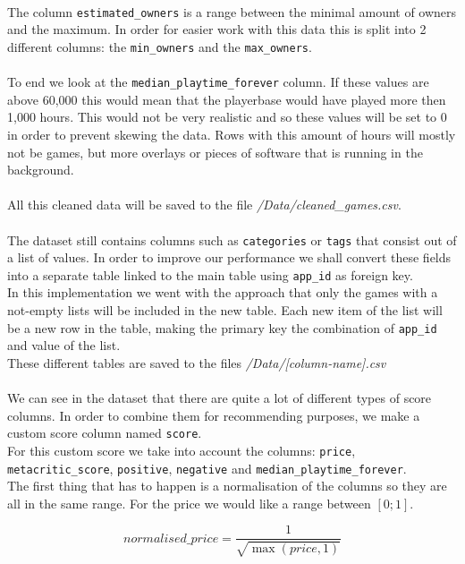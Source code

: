 \documentclass{article}
\begin{document}
	\\
	The column \texttt{estimated\_owners} is a range between the minimal amount of owners and the maximum. In order for easier work with this data this is split into 2 different columns: the \texttt{min\_owners} and the \texttt{max\_owners}.\\
	\\
	To end we look at the \texttt{median\_playtime\_forever} column. If these values are above 60,000 this would mean that the playerbase would have played more then 1,000 hours. This would not be very realistic and so these values will be set to 0 in order to prevent skewing the data. Rows with this amount of hours will mostly not be games, but more overlays or pieces of software that is running in the background.\\
	\\
	All this cleaned data will be saved to the file \textit{/Data/cleaned\_games.csv}.\\
	\\
	The dataset still contains columns such as \texttt{categories} or \texttt{tags} that consist out of a list of values. In order to improve our performance we shall convert these fields into a separate table linked to the main table using \texttt{app\_id} as foreign key.\\
	In this implementation we went with the approach that only the games with a not-empty lists will be included in the new table. Each new item of the list will be a new row in the table, making the primary key the combination of \texttt{app\_id} and value of the list.\\
	These different tables are saved to the files \textit{/Data/[column-name].csv}\\
	\\
	We can see in the dataset that there are quite a lot of different types of score columns. In order to combine them for recommending purposes, we make a custom score column named \texttt{score}.\\
	For this custom score we take into account the columns: \texttt{price}, \texttt{metacritic\_score}, \texttt{positive}, \texttt{negative} and \texttt{median\_playtime\_forever}.\\
	The first thing that has to happen is a normalisation of the columns so they are all in the same range. For the price we would like a range between $\left[0;1\right]$.
	
	$$normalised\_price = \frac{1}{\sqrt{\max{\left(price, 1\right)}}}$$
	
\end{document}
